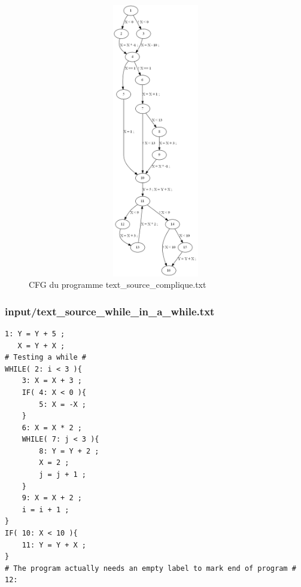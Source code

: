 \documentclass[a4paper]{article}
\begin{document}
\begin{figure}[h!]
  \centering
  \includegraphics[width=12cm,height=12cm,keepaspectratio]{input/text_source_complique_cfg.png}
  \caption{CFG du programme text\_source\_complique.txt}
  \label{fig:cfg3}
\end{figure}

\subsubsection{input/text\_source\_while\_in\_a\_while.txt}

\begin{verbatim}
1: Y = Y + 5 ;
   X = Y + X ;
# Testing a while #
WHILE( 2: i < 3 ){
    3: X = X + 3 ;
    IF( 4: X < 0 ){
        5: X = -X ;
    }
    6: X = X * 2 ;
    WHILE( 7: j < 3 ){
        8: Y = Y + 2 ;
        X = 2 ;
        j = j + 1 ;
    }
    9: X = X + 2 ;
    i = i + 1 ;
}
IF( 10: X < 10 ){
    11: Y = Y + X ;
}
# The program actually needs an empty label to mark end of program #
12:
\end{verbatim}
\end{document}
